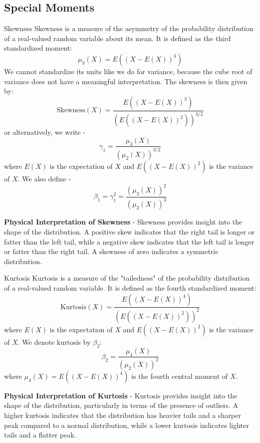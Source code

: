 \documentclass[openany]{book}
\begin{document}
\subsection{Special Moments}
\begin{mydefinition}{Skewness}
    Skewness is a measure of the asymmetry of the probability distribution of a real-valued random variable about its mean. It is defined as the third standardized moment:
    $$\mu_3(X) = E((X - E(X))^3)$$
    We cannot standardize its units like we do for variance, because the cube root of variance does not have a meaningful interpretation.
    The skewness is then given by:
    $$\text{Skewness}(X) = \frac{E((X - E(X))^3)}{(E((X - E(X))^2))^{3/2}}$$
    or alternatively, we write - 
    $$\gamma_1 = \frac{\mu_3(X)}{(\mu_2(X))^{3/2}}$$
    where $E(X)$ is the expectation of $X$ and $E((X - E(X))^2)$ is the variance of $X$.
    We also define - 
    $$\beta_1 = \gamma_1^2 = \frac{(\mu_3(X))^2}{(\mu_2(X))^3}$$
\end{mydefinition}
\textbf{Physical Interpretation of Skewness} - Skewness provides insight into the shape of the distribution. A positive skew indicates that the right tail is longer or fatter than the left tail, while a negative skew indicates that the left tail is longer or fatter than the right tail. A skewness of zero indicates a symmetric distribution.
\begin{mydefinition}{Kurtosis}
    Kurtosis is a measure of the "tailedness" of the probability distribution of a real-valued random variable. It is defined as the fourth standardized moment:
    $$\text{Kurtosis}(X) = \frac{E((X - E(X))^4)}{(E((X - E(X))^2))^2}$$
    where $E(X)$ is the expectation of $X$ and $E((X - E(X))^2)$ is the variance of $X$.
    We denote kurtosis by $\beta_2$:
    $$\beta_2 = \frac{\mu_4(X)}{(\mu_2(X))^2}$$
    where $\mu_4(X) = E((X - E(X))^4)$ is the fourth central moment of $X$.
\end{mydefinition}
\textbf{Physical Interpretation of Kurtosis} - Kurtosis provides insight into the shape of the distribution, particularly in terms of the presence of outliers.
A higher kurtosis indicates that the distribution has heavier tails and a sharper peak compared to a normal distribution, while a lower kurtosis indicates lighter tails and a flatter peak.
\end{document}
